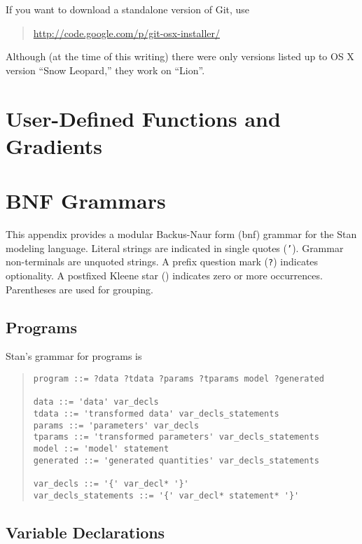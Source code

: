 \documentclass[10pt]{report}
\newcommand{\Stan}{Stan\xspace}
\newcommand{\acronym}[1]{{\sc #1}\xspace}
\newcommand{\BNF}{\acronym{bnf}}
\newcommand{\code}[1]{{\tt #1}}
\begin{document}
If you want to download a standalone version of Git, use

\begin{quote}
\url{http://code.google.com/p/git-osx-installer/}
\end{quote}

Although (at the time of this writing) there were only versions listed
up to OS X version ``Snow Leopard,'' they work on ``Lion''.

\chapter{User-Defined Functions and Gradients}\label{user-defined-functions.appendix}


\chapter{BNF Grammars}

This appendix provides a modular Backus-Naur form (\BNF) grammar for
the \Stan modeling language.  Literal strings are indicated in single
quotes (\code{'}).  Grammar non-terminals are unquoted strings.  A
prefix question mark (\code{?}) indicates optionality.  A postfixed
Kleene star (\code{*}) indicates zero or more occurrences.
Parentheses are used for grouping.

\section{Programs}

\Stan's grammar for programs is
%
\begin{quote}
\begin{Verbatim}
program ::= ?data ?tdata ?params ?tparams model ?generated

data ::= 'data' var_decls
tdata ::= 'transformed data' var_decls_statements
params ::= 'parameters' var_decls
tparams ::= 'transformed parameters' var_decls_statements
model ::= 'model' statement
generated ::= 'generated quantities' var_decls_statements

var_decls ::= '{' var_decl* '}'
var_decls_statements ::= '{' var_decl* statement* '}'
\end{Verbatim}
\end{quote}

\section{Variable Declarations}
\end{document}
